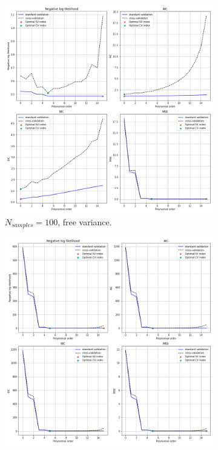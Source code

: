 \documentclass{article}
\begin{document}
\begin{figure}[!htb]
     \begin{subfigure}[b]{0.45\textwidth}
         \centering
         \includegraphics[width=\textwidth]{Q2b_fig2_2.png}
         \caption{$N_{samples} = 100$, free variance.}
     \end{subfigure}
     \hfill
     \begin{subfigure}[b]{0.45\textwidth}
         \centering
         \includegraphics[width=\textwidth]{Q2b_fig2_3.png}

\end{subfigure}
\end{figure}
\end{document}
